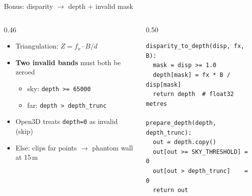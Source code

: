 \documentclass[aspectratio=169,11pt]{beamer}
\newcommand{\code}[1]{\texttt{#1}}
\newcommand{\orange}[1]{\textcolor{warnOrange}{#1}}
\begin{document}
\begin{frame}[fragile]{Bonus: disparity $\rightarrow$ depth + invalid mask}
\begin{columns}[T,totalwidth=\textwidth]
\begin{column}{0.46\textwidth}
\begin{itemize}
    \item Triangulation: $Z = f_x \cdot B / d$
    \item \textbf{Two invalid bands} must both be zeroed
    \begin{itemize}
        \item sky: \code{depth >= 65000}
        \item far: \code{depth > depth\_trunc}
    \end{itemize}
    \item Open3D treats \code{depth=0} as invalid (skip)
    \item Else: clips far points $\rightarrow$ \orange{phantom wall at 15\,m}
\end{itemize}
\end{column}
\begin{column}{0.50\textwidth}
\scriptsize
\begin{verbatim}
disparity_to_depth(disp, fx, B):
  mask = disp >= 1.0
  depth[mask] = fx * B / disp[mask]
  return depth  # float32 metres

prepare_depth(depth, depth_trunc):
  out = depth.copy()
  out[out >= SKY_THRESHOLD] = 0
  out[out > depth_trunc]    = 0
  return out
\end{verbatim}
\end{column}
\end{columns}
\end{frame}
\end{document}
